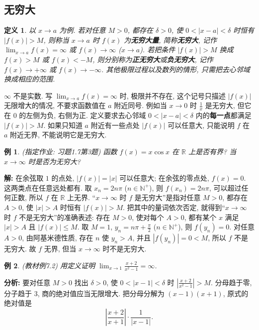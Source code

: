 \documentclass[UTF8,openany]{ctexbook}
\theoremstyle{chinesetextbook}
\newtheorem{definition}{定义}[section]
\newtheorem{example}{例}[section]
\newenvironment{cnsolution}{\par\indent\textbf{解:} \ignorespaces}{\par}
\begin{document}
\subsection{无穷大}
\begin{definition}
以 $x\to a$ 为例. 若对任意 $M>0$, 都存在 $\delta>0$, 使 $0<|x-a|<\delta$ 时恒有 $|f(x)|>M$, 则称当 $x\to a$ 时 $f(x)$ 为\textbf{无穷大量}, 简称\textbf{无穷大}, 记作 $\displaystyle\lim_{x\to a}f(x)=\infty$ 或 $f(x)\to\infty$ ($x\to a$). 若把条件 $|f(x)|>M$ 换成 $f(x)>M$ 或 $f(x)<-M$, 则分别称为\textbf{正无穷大}或\textbf{负无穷大}, 记作 $f(x)\to+\infty$ 或 $f(x)\to-\infty$. 其他极限过程以及数列的情形, 只需把去心邻域换成相应的范围.
\end{definition}
$\infty$ 不是实数. 写 $\displaystyle\lim_{x\to a}f(x)=\infty$ 时, 极限并不存在, 这个记号只描述 $|f(x)|$ 无限增大的情况, 不要求函数值在 $a$ 附近同号. 例如当 $x\to0$ 时 $\displaystyle\frac1x$ 是无穷大, 但它在 $0$ 的左侧为负, 右侧为正. 定义要求去心邻域 $0<|x-a|<\delta$ 内的\textbf{每一点}都满足 $|f(x)|>M$. 如果只知道 $a$ 附近有一些点处 $|f(x)|$ 可以任意大, 只能说明 $f$ 在 $a$ 附近无界, 不能说明它是无穷大.
\begin{example}
\textnormal{(指定作业: 习题1.7第3题)} 函数 $f(x)=x\cos x$ 在 $\mathbb R$ 上是否有界? 当 $x\to\infty$ 时是否为无穷大?
\end{example}
\begin{cnsolution}
在余弦取 $1$ 的点处, $|f(x)|=|x|$ 可以任意大; 在余弦的零点处, $f(x)=0$. 这两类点在任意远处都有. 取 $x_n=2n\pi$ ($n\in\mathbb N^+$), 则 $f(x_n)=2n\pi$, 可以超过任何正数, 所以 $f$ 在 $\mathbb R$ 上无界. “$x\to\infty$ 时 $f$ 是无穷大”是指对任意 $M>0$, 都存在 $A>0$, 使 $|x|>A$ 时恒有 $|f(x)|>M$. 把其中的量词依次否定, 就得到“$x\to\infty$ 时 $f$ 不是无穷大”的准确表述: 存在 $M>0$, 使对每个 $A>0$, 都有某个 $x$ 满足 $|x|>A$ 且 $|f(x)|\le M$. 取 $M=1$, $\displaystyle y_n=n\pi+\frac\pi2$ ($n\in\mathbb N^+$), 则 $f(y_n)=0$. 对任意 $A>0$, 由阿基米德性质, 存在 $n$ 使 $y_n>A$, 并且 $|f(y_n)|=0<M$, 所以 $f$ 不是无穷大. 故 $f$ 无界, 但当 $x\to\infty$ 时不是无穷大.
\end{cnsolution}
\begin{example}
\textnormal{(教材例7.2)} 用定义证明 $\displaystyle\lim_{x\to1}\frac{x+2}{x^2-1}=\infty$.
\end{example}
\par\indent\textbf{分析:} 要对任意 $M>0$ 找出 $\delta>0$, 使 $0<|x-1|<\delta$ 时 $\displaystyle\left|\frac{x+2}{x^2-1}\right|>M$. 分母趋于零, 分子趋于 $3$, 商的绝对值应当无限增大. 把分母分解为 $(x-1)(x+1)$, 原式的绝对值是
\[
\left|\frac{x+2}{x+1}\right|\cdot\frac1{|x-1|}.
\]
\end{document}
